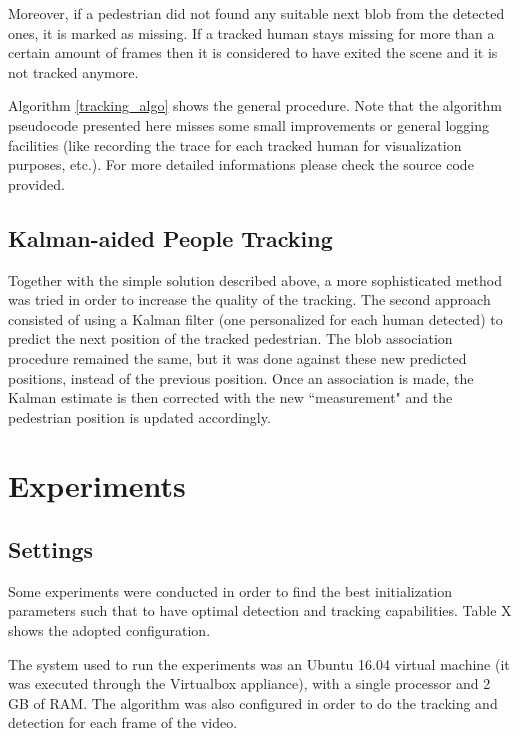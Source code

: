 \documentclass[runningheads]{llncs}
\begin{document}
Moreover, if a pedestrian did not found any suitable next blob from the detected ones, it is marked as missing. If a tracked human stays missing for more than a certain amount of frames then it is considered to have exited the scene and it is not tracked anymore.

Algorithm \ref{tracking_algo} shows the general procedure. Note that the algorithm pseudocode presented here misses some small improvements or general logging facilities (like recording the trace for each tracked human for visualization purposes, etc.).
For more detailed informations please check the source code provided.

\subsection{Kalman-aided People Tracking}

Together with the simple solution described above, a more sophisticated method was tried in order to increase the quality of the tracking. The second approach consisted of using a Kalman filter (one personalized for each human detected) to predict the next position of the tracked pedestrian. The blob association procedure remained the same, but it was done against these new predicted positions, instead of the previous position. Once an association is made, the Kalman estimate is then corrected with the new ``measurement" and the pedestrian position is updated accordingly.


\section{Experiments}

\subsection{Settings}
Some experiments were conducted in order to find the best initialization parameters such that to have optimal detection and tracking capabilities. Table X shows the adopted configuration. 

The system used to run the experiments was an Ubuntu 16.04 virtual machine (it was executed through the Virtualbox appliance), with a single processor and 2 GB of RAM. The algorithm was also configured in order to do the tracking and detection for each frame of the video.
\end{document}
